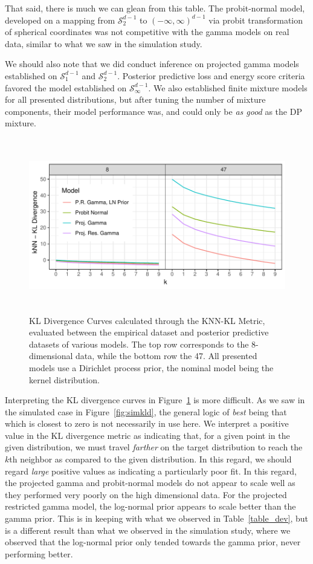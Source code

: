 That said, there is much we can glean from this table.  The probit-normal model, developed on a mapping
  from $\mathcal{S}_{2}^{d-1}$ to $(-\infty,\infty)^{d-1}$ via probit transformation of spherical coordinates
  was not competitive with the gamma models on real data, similar to what we saw in the simulation study.

We should also note that we did conduct inference on projected gamma models established on
  $\mathcal{S}_{1}^{d-1}$ and $\mathcal{S}_2^{d-1}$.  Posterior predictive loss and energy score criteria
  favored the model established on $\mathcal{S}_{\infty}^{d-1}$.  We also established finite mixture
  models for all presented distributions, but after tuning the number of mixture components, their
  model performance was, and could only be \emph{as good} as the DP mixture.

\begin{figure}[h]
  \centering
  \label{fig:knnkl}
  \includegraphics[width = 6in, height = 3in]{./images/knn_kl_divergence_curves}
  \caption{KL Divergence Curves calculated through the KNN-KL Metric, evaluated between the empirical
  dataset and posterior predictive datasets of various models.  The top row corresponds to the
  8-dimensional data, while the bottom row the 47.  All presented models use a Dirichlet process
  prior, the nominal model being the kernel distribution.}
\end{figure}

Interpreting the KL divergence curves in Figure~\ref{fig:knnkl} is more difficult.  As we saw in the
  simulated case in Figure~\ref{fig:simkld}, the general logic of \emph{best} being that which is
  closest to zero is not necessarily in use here.  We interpret a positive value in the KL divergence metric
  as indicating that, for a given point in the given distribution, we must travel \emph{farther} on
  the target distribution to reach the $k$th neighbor as compared to the given distribution.  In this
  regard, we should regard \emph{large} positive values as indicating a particularly poor fit.  In this
  regard, the projected gamma and probit-normal models do not appear to scale well as they performed
  very poorly on the high dimensional data.  For the projected restricted gamma model, the log-normal
  prior appears to scale better than the gamma prior.  This is in keeping with what we observed in
  Table~\ref{table_dev}, but is a different result than what we observed in the simulation study, where
  we observed that the log-normal prior only tended towards the gamma prior, never performing better.


